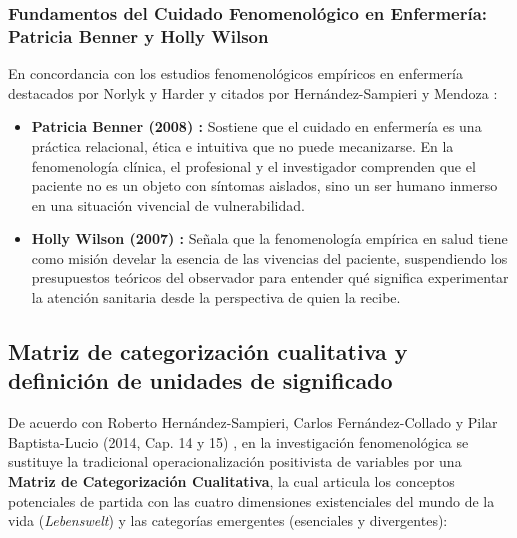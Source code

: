 \subsubsection{Fundamentos del Cuidado Fenomenológico en Enfermería: Patricia Benner y Holly Wilson}
\label{sec:3.2.3_benner_wilson}
En concordancia con los estudios fenomenológicos empíricos en enfermería destacados por Norlyk y Harder \cite{norlyk2010} y citados por Hernández-Sampieri y Mendoza \cite{sampieri2018}:
\begin{itemize}
    \item \textbf{Patricia Benner (2008) \cite{benner2008}:} Sostiene que el cuidado en enfermería es una práctica relacional, ética e intuitiva que no puede mecanizarse. En la fenomenología clínica, el profesional y el investigador comprenden que el paciente no es un objeto con síntomas aislados, sino un ser humano inmerso en una situación vivencial de vulnerabilidad.
    \item \textbf{Holly Wilson (2007) \cite{wilson2007}:} Señala que la fenomenología empírica en salud tiene como misión develar la esencia de las vivencias del paciente, suspendiendo los presupuestos teóricos del observador para entender qué significa experimentar la atención sanitaria desde la perspectiva de quien la recibe.
\end{itemize}

\subsection{Matriz de categorización cualitativa y definición de unidades de significado}
\label{sec:3.3_categorias}
De acuerdo con Roberto Hernández-Sampieri, Carlos Fernández-Collado y Pilar Baptista-Lucio (2014, Cap. 14 y 15) \cite{sampieri2018}, en la investigación fenomenológica se sustituye la tradicional operacionalización positivista de variables por una \textbf{Matriz de Categorización Cualitativa}, la cual articula los conceptos potenciales de partida con las cuatro dimensiones existenciales del mundo de la vida (\textit{Lebenswelt}) y las categorías emergentes (esenciales y divergentes):

